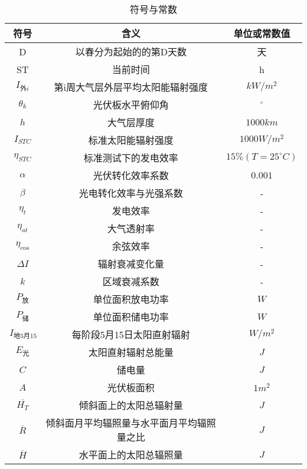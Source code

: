 \documentclass[withoutpreface,bwprint]{cumcmthesis} %
\begin{document}
\begin{table}[!htbp]
    \caption{符号与常数}\label{tab:001} \centering
    \setlength{\tabcolsep}{15pt}
    \begin{tabular}{ccc}
        \toprule[1.5pt]
        符号 & 含义 & 单位或常数值\\
        \midrule[1pt]
        D & 以春分为起始的的第D天数 & 天\\
        ST & 当前时间 & h\\
        $I_{\mbox{外}i}$ & 第i周大气层外层平均太阳能辐射强度 & $kW/m^{2}$\\
        $\theta_{k}$ & 光伏板水平俯仰角 & $^{\circ}$\\
        $h$ & 大气层厚度 & $1000km$\\
        $I_{STC}$ & 标准太阳能辐射强度 & $1000W/m^{2}$\\
        $\eta_{STC}$ & 标准测试下的发电效率 & $15\%(T=25^{\circ}C)$\\
        $\alpha$ & 光伏转化效率系数 & $0.001$\\
        $\beta$ & 光电转化效率与光强系数 & -\\
        $\eta_{t}$ & 发电效率 & -\\
        $\eta_{at}$ & 大气透射率 & -\\
        $\eta_{\cos}$ & 余弦效率 & -\\
        $\Delta I$ & 辐射衰减变化量 & -\\
        $k$ & 区域衰减系数 & -\\
        $P_{\mbox{放}}$ & 单位面积放电功率 & $W$\\
        $P_{\mbox{储}}$ & 单位面积储电功率 & $W$\\
        $I_{\mbox{地5月15}}$ & 每阶段5月15日太阳直射辐射 & $W/m^2$\\
        $E_{\mbox{光}}$ & 太阳直射辐射总能量 & $J$\\
        $C$ & 储电量 & $J$\\
        $A$ & 光伏板面积 & $1m^{2}$\\
        $\overline{H_{T}}$ & 倾斜面上的太阳总辐射量 & $J$\\
        $\overline{R}$ & 倾斜面月平均辐照量与水平面月平均辐照量之比 & $J$\\
        $\overline{H}$ & 水平面上的太阳总辐照量 & $J$\\
        \bottomrule[1.5pt]
    \end{tabular}
\end{table}

\bigskip
\end{document}
